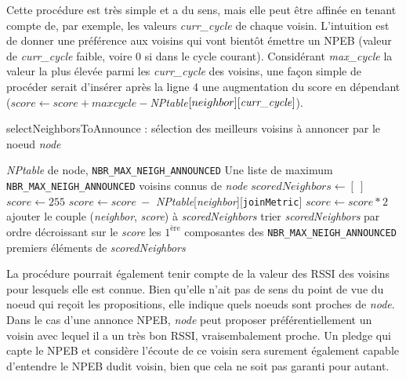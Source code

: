 \documentclass[]{report}
\begin{document}
\newpage

Cette procédure est très simple et a du sens, mais elle peut être affinée en tenant compte de, par exemple, les valeurs \textit{curr\_cycle} de chaque voisin. L'intuition est de donner une préférence aux voisins qui vont bientôt émettre un NPEB (valeur de \textit{curr\_cycle} faible, voire 0 si dans le cycle courant). Considérant \textit{max\_cycle} la valeur la plus élevée parmi les \textit{curr\_cycle} des voisins, une façon simple de procéder serait d'insérer après la ligne 4 une augmentation du score en dépendant ($score \leftarrow score +  maxcycle - $\textit{NPtable}$[neighbor][\text{\textit{curr\_cycle}}]$).

\vspace{0.3cm}
\begin{algorithm}[!h]
\caption{selectNeighborsToAnnounce : sélection des meilleurs voisins à annoncer par le noeud \textit{node}}
\begin{algorithmic}[1]
\Require \textit{NPtable} de node, \texttt{NBR\_MAX\_NEIGH\_ANNOUNCED}
\Ensure Une liste de maximum \texttt{NBR\_MAX\_NEIGH\_ANNOUNCED} voisins connus de \textit{node}
\State $scoredNeighbors \leftarrow [\ ]$
\State $score \leftarrow 255$
\State $score \leftarrow score\ - $ \textit{NPtable}[\textit{neighbor}][\texttt{joinMetric}]
\State $score \leftarrow score * 2$
\EndIf
\State ajouter le couple (\textit{neighbor}, \textit{score}) à \textit{scoredNeighbors}
\EndFor
\State trier \textit{scoredNeighbors} par ordre décroissant sur le \textit{score}
\State\Return les $1^{\text{ère}}$ composantes des \texttt{NBR\_MAX\_NEIGH\_ANNOUNCED} premiers éléments de \textit{scoredNeighbors}
\end{algorithmic}
\label{proc_announce}
\end{algorithm}
\vspace{0.2cm}

La procédure pourrait également tenir compte de la valeur des RSSI des voisins pour lesquels elle est connue. Bien qu'elle n'ait pas de sens du point de vue du noeud qui reçoit les propositions, elle indique quels noeuds sont proches de \textit{node}. Dans le cas d'une annonce NPEB, \textit{node} peut proposer préférentiellement un voisin avec lequel il a un très bon RSSI, vraisembalement proche. Un pledge qui capte le NPEB et considère l'écoute de ce voisin sera surement également capable d'entendre le NPEB dudit voisin, bien que cela ne soit pas garanti pour autant.
\end{document}
